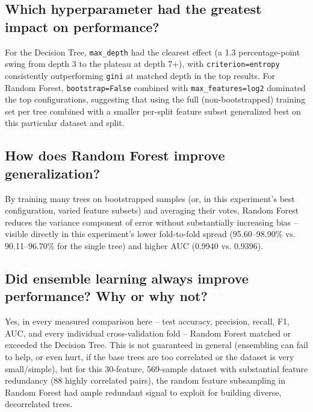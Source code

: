 \documentclass[12pt,a4paper]{article}
\begin{document}
\subsection*{Which hyperparameter had the greatest impact on performance?}
For the Decision Tree, \texttt{max\_depth} had the clearest effect (a 1.3 percentage-point swing
from depth 3 to the plateau at depth 7+), with \texttt{criterion=entropy} consistently
outperforming \texttt{gini} at matched depth in the top results. For Random Forest,
\texttt{bootstrap=False} combined with \texttt{max\_features=log2} dominated the top
configurations, suggesting that using the full (non-bootstrapped) training set per tree combined
with a smaller per-split feature subset generalized best on this particular dataset and split.

\subsection*{How does Random Forest improve generalization?}
By training many trees on bootstrapped samples (or, in this experiment's best configuration,
varied feature subsets) and averaging their votes, Random Forest reduces the variance component
of error without substantially increasing bias -- visible directly in this experiment's lower
fold-to-fold spread (95.60--98.90\% vs. 90.11--96.70\% for the single tree) and higher AUC
(0.9940 vs. 0.9396).

\subsection*{Did ensemble learning always improve performance? Why or why not?}
Yes, in every measured comparison here -- test accuracy, precision, recall, F1, AUC, and every
individual cross-validation fold -- Random Forest matched or exceeded the Decision Tree. This is
not guaranteed in general (ensembling can fail to help, or even hurt, if the base trees are too
correlated or the dataset is very small/simple), but for this 30-feature, 569-sample dataset with
substantial feature redundancy (88 highly correlated pairs), the random feature subsampling in
Random Forest had ample redundant signal to exploit for building diverse, decorrelated trees.
\end{document}
